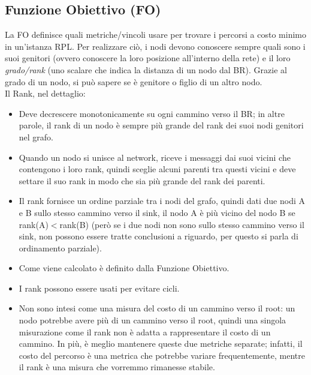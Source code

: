 \documentclass{article}
\begin{document}
\subsection{Funzione Obiettivo (FO)}
La FO definisce quali metriche/vincoli usare per trovare i percorsi a costo minimo in un'istanza RPL. Per realizzare ciò, i nodi devono conoscere sempre quali sono i suoi genitori (ovvero conoscere la loro posizione all'interno della rete) e il loro \textit{grado/rank} (uno scalare che indica la distanza di un nodo dal BR). Grazie al grado di un nodo, si può sapere se è genitore o figlio di un altro nodo. \\
Il Rank, nel dettaglio:
\begin{itemize}
    \item Deve decrescere monotonicamente su ogni cammino verso il BR; in altre parole, il rank di un nodo è sempre più grande del rank dei suoi nodi genitori nel grafo.
    \item Quando un nodo si unisce al network, riceve i messaggi dai suoi vicini che contengono i loro rank, quindi sceglie alcuni parenti tra questi vicini e deve settare il suo rank in modo che sia più grande del rank dei parenti.
    \item Il rank fornisce un ordine parziale tra i nodi del grafo, quindi dati due nodi A e B sullo stesso cammino verso il sink, il nodo A è più vicino del nodo B se rank(A)$<$rank(B) (però se i due nodi non sono sullo stesso cammino verso il sink, non possono essere tratte conclusioni a riguardo, per questo si parla di ordinamento parziale).
    \item Come viene calcolato è definito dalla Funzione Obiettivo.
    \item I rank possono essere usati per evitare cicli.
    \item Non sono intesi come una misura del costo di un cammino verso il root: un nodo potrebbe avere più di un cammino verso il root, quindi una singola misurazione come il rank non è adatta a rappresentare il costo di un cammino. In più, è meglio mantenere queste due metriche separate; infatti, il costo del percorso è una metrica che potrebbe variare frequentemente, mentre il rank è una misura che vorremmo rimanesse stabile.
\end{itemize}
\end{document}
